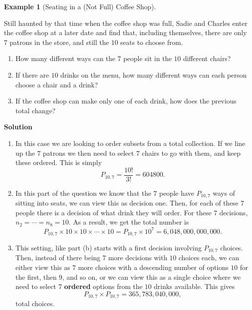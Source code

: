 \documentclass[
  letterpaper,
  DIV=11,
  numbers=noendperiod]{scrreprt}
\providecommand{\tightlist}{%
  \setlength{\itemsep}{0pt}\setlength{\parskip}{0pt}}\usepackage{longtable,booktabs,array}
\theoremstyle{definition}
\theoremstyle{definition}
\newtheorem{example}{Example}[chapter]
\theoremstyle{definition}
\theoremstyle{remark}
\begin{document}
\begin{example}[Seating in a (Not Full) Coffee
Shop]\protect\hypertarget{exm-permutations}{}\label{exm-permutations}

Still haunted by that time when the coffee shop was full, Sadie and
Charles enter the coffee shop at a later date and find that, including
themselves, there are only \(7\) patrons in the store, and still the
\(10\) seats to choose from.

\begin{enumerate}
\def\labelenumi{\alph{enumi}.}
\tightlist
\item
  How many different ways can the \(7\) people sit in the \(10\)
  different chairs?
\item
  If there are \(10\) drinks on the menu, how many different ways can
  each person choose a chair and a drink?
\item
  If the coffee shop can make only one of each drink, how does the
  previous total change?
\end{enumerate}

\begin{tcolorbox}[enhanced jigsaw, colback=white, colframe=quarto-callout-color-frame, arc=.35mm, leftrule=.75mm, rightrule=.15mm, opacityback=0, breakable, bottomrule=.15mm, left=2mm, toprule=.15mm]

\vspace{-3mm}\textbf{Solution}\vspace{3mm}

\begin{enumerate}
\def\labelenumi{\alph{enumi}.}
\item
  In this case we are looking to order subsets from a total collection.
  If we line up the \(7\) patrons we then need to select \(7\) chairs to
  go with them, and keep these ordered. This is simply
  \[P_{10,7} = \frac{10!}{3!} = 604800.\]
\item
  In this part of the question we know that the \(7\) people have
  \(P_{10,7}\) ways of sitting into seats, we can view this as decision
  one. Then, for each of these \(7\) people there is a decision of what
  drink they will order. For these \(7\) decisions,
  \(n_2 = \cdots = n_8 = 10\). As a result, we get the total number is
  \[P_{10,7}\times10\times10\times\cdots\times10 = P_{10,7}\times 10^{7} = 6,048,000,000,000.\]
\item
  This setting, like part (b) starts with a first decision involving
  \(P_{10,7}\) choices. Then, instead of there being \(7\) more
  decisions with \(10\) choices each, we can either view this as \(7\)
  more choices with a descending number of options \(10\) for the first,
  then \(9\), and so on, or we can view this as a single choice where we
  need to select \(7\) \textbf{ordered} options from the \(10\) drinks
  available. This gives \[P_{10,7} \times P_{10,7} = 365,783,040,000,\]
  total choices.
\end{enumerate}

\end{tcolorbox}

\end{example}
\end{document}
